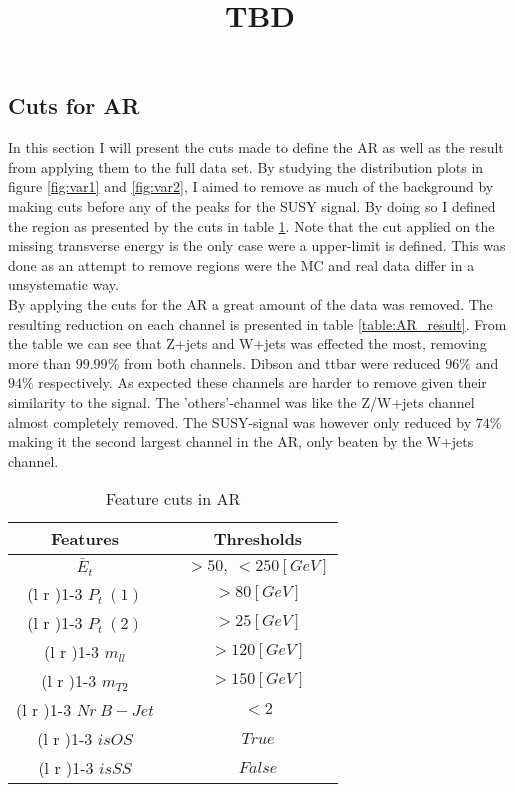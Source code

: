 \documentclass{article}
\begin{document}
\subsection{Cuts for AR}
In this section I will present the cuts made to define the AR as well as the result from applying them to the full data set. By studying the distribution plots in figure \ref{fig:var1} and \ref{fig:var2}, I aimed to remove as much of the background by making cuts before any of the peaks for the SUSY signal. By doing so I defined the region as presented by the cuts in table \ref{table:AR}. Note that the cut applied on the missing transverse energy is the only case were a upper-limit is defined. This was done as an attempt to remove regions were the MC and real data differ in a unsystematic way. \\
By applying the cuts for the AR a great amount of the data was removed. The resulting reduction on each channel is presented in table \ref{table:AR_result}. From the table we can see that Z+jets and W+jets was effected the most, removing more than $99.99\%$ from both channels. Dibson and ttbar were reduced $96\%$ and $94\%$ respectively. As expected these channels are harder to remove given their similarity to the signal. The 'others'-channel was like the Z/W+jets channel almost completely removed. The SUSY-signal was however only reduced by $74\%$ making it the second largest channel in the AR, only beaten by the W+jets channel.
\bgroup
\title{TBD}
{\tabcolsep=20pt
\begin{table}[h!]
    \caption{Feature cuts in AR}
    \label{table:AR}
    \centering 
    \begin{threeparttable}
    \begin{tabular}{ccc}
    Features & & Thresholds\\
     \midrule\midrule
    $\bar{E}_t$   & &  $> 50, \ < 250[GeV]$  \\%
    \cmidrule(l  r ){1-3}
     $P_t \ (1)$ & &  $> 80[GeV]$  \\ 
    \cmidrule(l r ){1-3}
     $P_t \ (2)$ & & $>25[GeV]$  \\ 
    \cmidrule(l r ){1-3}
    $m_{ll}$ & & $>120[GeV]$  \\
    \cmidrule(l r ){1-3}
    $m_{T2}$  & & $>150[GeV]$ \\
    \cmidrule(l r ){1-3}
    $Nr\ B-Jet$ & & $<2$  \\ 
    \cmidrule(l r ){1-3}
    $isOS$ & & $True$  \\ 
    \cmidrule(l r ){1-3}
    $isSS$ & & $False$  \\ 
    \midrule\midrule
    \end{tabular}
    \end{threeparttable}
\end{table}
}
\end{document}
